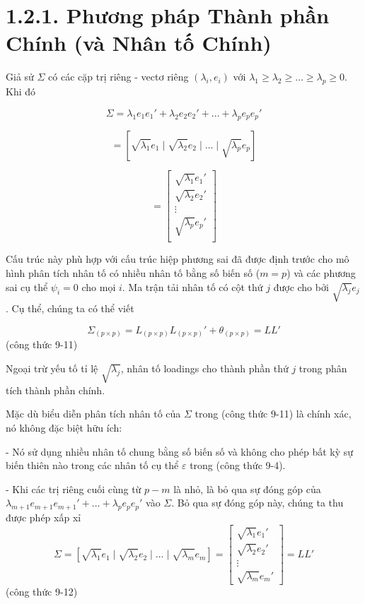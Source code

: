 \documentclass{article}
\begin{document}
\section*{1.2.1. Phương pháp Thành phần Chính (và Nhân tố Chính)}

 Giả sử \( \Sigma \) có các cặp trị riêng - vectơ riêng \( (\lambda_i, e_i) \) với \( \lambda_1 \geq \lambda_2 \geq \ldots \geq \lambda_p \geq 0 \). Khi đó

\[
\Sigma = \lambda_1 e_1 e_1' + \lambda_2 e_2 e_2' + \ldots + \lambda_p e_p e_p'
\]

\[
= \left[ \sqrt{\lambda_1} e_1 \mid \sqrt{\lambda_2} e_2 \mid \ldots \mid \sqrt{\lambda_p} e_p \right]
\]

\[
= \begin{bmatrix}
\sqrt{\lambda_1} e_1' \\
\sqrt{\lambda_2} e_2' \\
\vdots \\
\sqrt{\lambda_p} e_p' \\
\end{bmatrix}
\]


Cấu trúc này phù hợp với cấu trúc hiệp phương sai đã được định trước cho mô hình phân tích nhân tố có nhiều nhân tố bằng số biến số (\( m = p \)) và các phương sai cụ thể \( \psi_i = 0 \) cho mọi \( i \). Ma trận tải nhân tố có cột thứ \( j \) được cho bởi \( \sqrt{\lambda_j} e_j \). Cụ thể, chúng ta có thể viết

\[
\Sigma_{(p \times p)} = L_{(p \times p)} L_{(p \times p)}' + \theta_{(p \times p)} = LL'
\]
(công thức 9-11)

Ngoại trừ yếu tố tỉ lệ \( \sqrt{\lambda_j} \), nhân tố loadings cho thành phần thứ \( j \) trong phân tích thành phần chính.

Mặc dù biểu diễn phân tích nhân tố của \( \Sigma \) trong (công thức 9-11) là chính xác, nó không đặc biệt hữu ích:

- Nó sử dụng nhiều nhân tố chung bằng số biến số và không cho phép bất kỳ sự biến thiên nào trong các nhân tố cụ thể \( \varepsilon \) trong (công thức 9-4).

- Khi các trị riêng cuối cùng từ \( p - m \) là nhỏ, là bỏ qua sự đóng góp của \( \lambda_{m+1}e_{m+1}e_{m+1}' + \ldots + \lambda_{p}e_{p}e_{p}' \) vào \( \Sigma \). 
Bỏ qua sự đóng góp này, chúng ta thu được phép xấp xỉ
\[
\Sigma = \left[ \sqrt{\lambda_1} e_1 \mid \sqrt{\lambda_2} e_2 \mid \ldots \mid \sqrt{\lambda_m} e_m \right] 
= \begin{bmatrix}
\sqrt{\lambda_1} e_1' \\
\sqrt{\lambda_2} e_2' \\
\vdots \\
\sqrt{\lambda_m} e_m'
\end{bmatrix}
= LL'
\]
(công thức 9-12)
\end{document}
